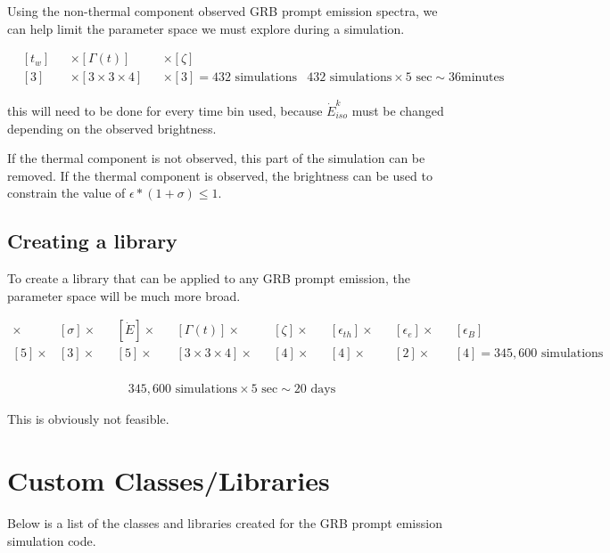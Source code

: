 \documentclass[linenumbers,twocolumn]{aastex631}
\begin{document}
\begin{appendix}
Using the non-thermal component observed GRB prompt emission spectra, we can help limit the parameter space we must explore during a simulation. 

\begin{align}
	& [t_w] &&\times [\Gamma(t)] &&\times [\zeta]  \\
	& [3] &&\times [3\times3\times4] &&\times [3] = 432 \text{ simulations}
	& 432 \text{ simulations} \times 5 \text{ sec} \sim 36 \text{minutes}
\end{align}

this will need to be done for every time bin used, because $\dot{E}^k_{iso}$ must be changed depending on the observed brightness.

If the thermal component is not observed, this part of the simulation can be removed. If the thermal component is observed, the brightness can be used to constrain the value of $\epsilon*(1+\sigma)\leq1$.

\subsection{Creating a library}

To create a library that can be applied to any GRB prompt emission, the parameter space will be much more broad. 

\begin{align}
	[t_w] \times &[\sigma] \times &&[\dot{E}] \times&&[\Gamma(t)] \times&&[\zeta] \times&&[\epsilon_{th}] \times&&[\epsilon_{e}] \times&&[\epsilon_{B}] \\ 
	[5] \times &[3] \times &&[5] \times&&[3\times3\times4] \times&&[4] \times&&[4] \times&&[2] \times&&[4] = 345,600 \text{ simulations} \\
\end{align}

\begin{align}
	345,600 \text{ simulations} \times 5 \text{ sec} \sim 20 \text{ days}
\end{align}

This is obviously not feasible.

\section{Custom Classes/Libraries}

Below is a list of the classes and libraries created for the GRB prompt emission simulation code.


\end{appendix}
\end{document}
